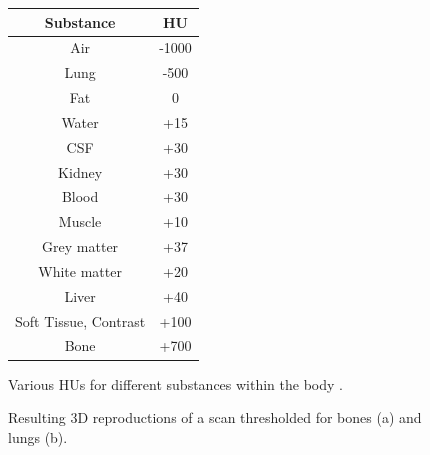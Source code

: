 \documentclass[conference,11pt]{IEEEtran}
\begin{document}
\begin{figure}[ht]
    \centering
	\begin{tabular} {|c|c|}
    	\hline
        \textnormal{Substance} & \textnormal{HU} \\ \hline
        \textnormal{Air} & -1000 \\ \hline
        \textnormal{Lung} & -500 \\ \hline
        \textnormal{Fat} & 0 \\ \hline
        \textnormal{Water} & +15 \\ \hline
        \textnormal{CSF} & +30 \\ \hline
        \textnormal{Kidney} & +30\\ \hline
        \textnormal{Blood} & +30 \\ \hline
        \textnormal{Muscle} & +10 \\ \hline
        \textnormal{Grey matter} & +37 \\ \hline
        \textnormal{White matter} & +20 \\ \hline
        \textnormal{Liver} & +40 \\ \hline
        \textnormal{Soft Tissue, Contrast} & +100 \\ \hline
        \textnormal{Bone} & +700 \\ \hline
    \end{tabular}
    \caption{Various HUs for different substances within the body \cite{noauthor_hounsfield_2017}.}
    \label{fig:hounsfieldunits}
\end{figure}

\begin{figure}
    \centering
    	\hspace{0.02\linewidth}
      \caption{Resulting 3D reproductions of a scan thresholded for bones (a) and lungs (b).}
      \label{fig:boneslungs}
\end{figure}
\end{document}
